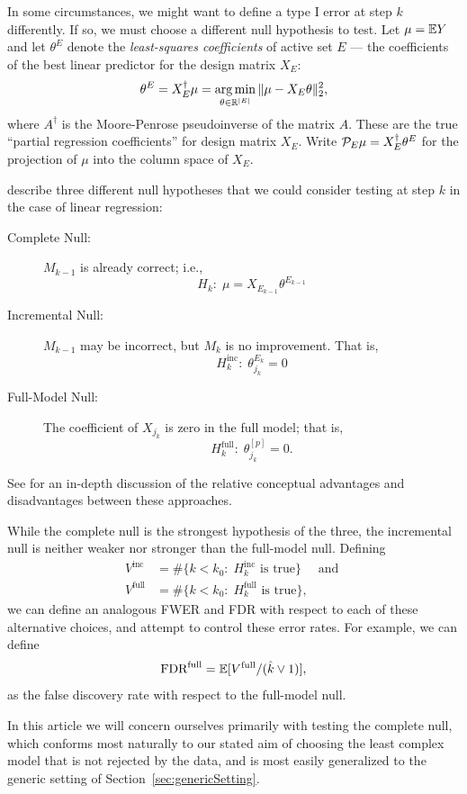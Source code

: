 \documentclass{article}
\begin{document}
In some circumstances, we might want to define a type I error at step $k$ differently. If so, we must choose a different null hypothesis to test. Let $\mu = \mathbb{E} Y$ and let $\theta^E$ denote the {\em least-squares coefficients} of active set $E$ --- the coefficients of the best linear predictor for the design matrix $X_E$:
\[
\theta^E = X_E^\dagger \mu = \operatorname*{arg\,min}_{\theta\in \mathbb{R}^{|E|}} \|\mu - X_E\theta\|_2^2,
\]
where $A^\dagger$ is the Moore-Penrose pseudoinverse of the matrix $A$. 
These are the true ``partial regression coefficients''  for design matrix $X_E$.
 Write $\mathcal{P}_E\mu = X_E^\dagger \theta^E$ for the projection of $\mu$ into the column space of $X_E$.

\citet{gsell2013sequential} describe three different null hypotheses that we could consider testing at step $k$ in the case of linear regression:
\begin{description}
\item[Complete Null:] $M_{k-1}$ is already correct; i.e.,
\[
H_k:\;\mu = X_{E_{k-1}} \theta^{E_{k-1}}
\]

\item[Incremental Null:] $M_{k-1}$ may be incorrect, but $M_k$ is no improvement. That is, 
\[
H_k^{\text{inc}}:\; \theta_{j_k}^{E_k} = 0
\]
\item[Full-Model Null:] The coefficient of $X_{j_k}$ is zero in the     full model; that is, 
\[
H_k^{\text{full}}:\; \theta_{j_k}^{[p]} = 0.
\]
\end{description}
See \citet{gsell2013false} for an in-depth discussion of the relative conceptual advantages and disadvantages between these approaches.

While the complete null is the strongest hypothesis of the three, the incremental null is neither weaker nor stronger than the full-model null. Defining 
\begin{align}
V^{\text{inc}} &= \#\{k < k_0:\; H_k^{\text{inc}} \text{ is true}\} \quad \text{ and } \\
V^{\text{full}} &= \#\{k < k_0:\; H_k^{\text{full}} \text{ is true}\},
\end{align}
we can define an analogous FWER and FDR with respect to each of these alternative choices, and attempt to control these error rates. For example, we can define
\[
\text{FDR}^{\text{full}} = \mathbb{E}[V^{\text{full}} / (\hat{k} \vee 1)],
\]
as the false discovery rate with respect to the full-model null.

In this article we will concern ourselves primarily with testing the complete null, which conforms most naturally to our stated aim of choosing the least complex model that is not rejected by the data, and is most easily generalized to the generic setting of Section~\ref{sec:genericSetting}. 
\end{document}
